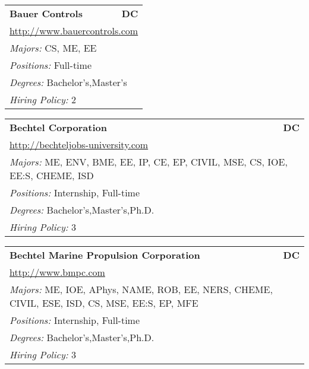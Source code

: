 \documentclass[twoside]{article}
\begin{document}
\begin{center}
\begin{multicols}{3}
\begin{FlushLeft}
\begin{minipage}{.9\columnwidth}
\end{minipage}
 
\begin{minipage}{.9\columnwidth}\begin{tabularx}{.95\columnwidth}{Xr}
                 {\Large\bf Bauer Controls} & {\Large\bf DC}\\
    \multicolumn{2}{p{.95\columnwidth}}{\url{http://www.bauercontrols.com}}\\
    \multicolumn{2}{p{.95\columnwidth}}{\emph{Majors:} CS, ME, EE}\\
    \multicolumn{2}{p{.95\columnwidth}}{\emph{Positions:} Full-time}\\
    \multicolumn{2}{p{.95\columnwidth}}{\emph{Degrees:} Bachelor's,Master's}\\
    \multicolumn{2}{p{.95\columnwidth}}{\emph{Hiring Policy:} 2}\\
    \end{tabularx}
    
\end{minipage}
 
\begin{minipage}{.9\columnwidth}\begin{tabularx}{.95\columnwidth}{Xr}
                 {\Large\bf Bechtel Corporation} & {\Large\bf DC}\\
    \multicolumn{2}{p{.95\columnwidth}}{\url{http://bechteljobs-university.com}}\\
    \multicolumn{2}{p{.95\columnwidth}}{\emph{Majors:} ME, ENV, BME, EE, IP, CE, EP, CIVIL, MSE, CS, IOE, EE:S, CHEME, ISD}\\
    \multicolumn{2}{p{.95\columnwidth}}{\emph{Positions:} Internship, Full-time}\\
    \multicolumn{2}{p{.95\columnwidth}}{\emph{Degrees:} Bachelor's,Master's,Ph.D.}\\
    \multicolumn{2}{p{.95\columnwidth}}{\emph{Hiring Policy:} 3}\\
    \end{tabularx}
    
\end{minipage}
 
\begin{minipage}{.9\columnwidth}\begin{tabularx}{.95\columnwidth}{Xr}
                 {\Large\bf Bechtel Marine Propulsion Corporation} & {\Large\bf DC}\\
    \multicolumn{2}{p{.95\columnwidth}}{\url{http://www.bmpc.com}}\\
    \multicolumn{2}{p{.95\columnwidth}}{\emph{Majors:} ME, IOE, APhys, NAME, ROB, EE, NERS, CHEME, CIVIL, ESE, ISD, CS, MSE, EE:S, EP, MFE}\\
    \multicolumn{2}{p{.95\columnwidth}}{\emph{Positions:} Internship, Full-time}\\
    \multicolumn{2}{p{.95\columnwidth}}{\emph{Degrees:} Bachelor's,Master's,Ph.D.}\\
    \multicolumn{2}{p{.95\columnwidth}}{\emph{Hiring Policy:} 3}\\
    \end{tabularx}
    

\end{minipage}
\end{FlushLeft}
\end{multicols}
\end{center}
\end{document}
